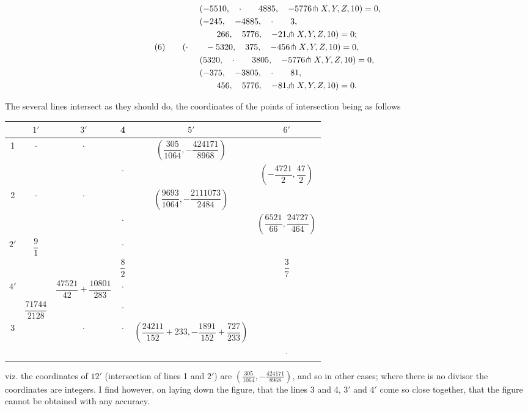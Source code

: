 \documentclass[11pt,a4paper]{article}
\begin{document}
\begin{align*}
&\qquad(-5510,\quad \cdot\qquad 4885,\quad -5776\hspace{-0.2em}\pitchfork X, Y, Z, 10) = 0,\\
&\qquad(-245,\quad -4885,\quad \cdot\qquad 3,\\
&\qquad\qquad 266,\quad 5776,\quad -21,\hspace{-0.2em}\pitchfork X, Y, Z, 10) = 0;\\
(6)\qquad &(\cdot\qquad -5320,\quad 375,\quad -456\hspace{-0.2em}\pitchfork X, Y, Z, 10) = 0,\\
&\qquad(5320,\quad \cdot\qquad 3805,\quad -5776\hspace{-0.2em}\pitchfork X, Y, Z, 10) = 0,\\
&\qquad(-375,\quad -3805,\quad \cdot\qquad 81,\\
&\qquad\qquad 456,\quad 5776,\quad -81,\hspace{-0.2em}\pitchfork X, Y, Z, 10) = 0.
\end{align*}

\newpage
\setcounter{page}{329}

The several lines intersect as they should do, the coordinates of the points of intersection being as follows
\begin{center}
\begin{tabular}{c|ccccc}
& $1'$ & $3'$ & 4 & $5'$ & $6'$\\\hline
\multirow{2}{*}{1} & $\cdot$ & $\cdot$ & & $\left(\dfrac{305}{1064}, -\dfrac{424171}{8968}\right)$ & \\[1em]
& & & $\cdot$ & & $\left(-\dfrac{4721}{2}, \dfrac{47}{2}\right)$\\[1em]
\multirow{2}{*}{2} & $\cdot$ & $\cdot$ & & $\left(\dfrac{9693}{1064}, -\dfrac{2111073}{2484}\right)$ & \\[1em]
& & & $\cdot$ & & $\left(\dfrac{6521}{66}, \dfrac{24727}{464}\right)$\\[1em]
\multirow{2}{*}{$2'$} & $\dfrac{9}{1}$ & & $\cdot$ & & \\[1em]
& & & $\dfrac{8}{2}$ & & $\dfrac{3}{7}$\\[1em]
\multirow{2}{*}{$4'$} & & $\dfrac{47521}{42} + \dfrac{10801}{283}$ & $\cdot$ & & \\[1em]
& $\dfrac{71744}{2128}$ & & $\cdot$ & & \\[1em]
\multirow{2}{*}{3} & & $\cdot$ & $\cdot$ & $\left(\dfrac{24211}{152} + 233, -\dfrac{1891}{152} + \dfrac{727}{233}\right)$ & \\[1em]
& & & & & $\cdot$
\end{tabular}
\end{center}
viz. the coordinates of $12'$ (intersection of lines 1 and $2'$) are $\left(\frac{305}{1064}, -\frac{424171}{8968}\right)$, and so in other cases; where there is no divisor the coordinates are integers. I find however, on laying down the figure, that the lines 3 and 4, $3'$ and $4'$ come so close together, that the figure cannot be obtained with any accuracy.
\end{document}
